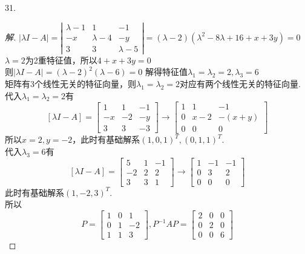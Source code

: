\documentclass[10pt,a4paper]{report}
\begin{document}
31.
\begin{proof}[解]
	$|\lambda I - A| = \left|
	\begin{matrix}
	\lambda-1 & 1 & -1\\
	-x & \lambda-4 & -y\\
	3 & 3 & \lambda - 5
	\end{matrix}
	\right| = (\lambda - 2)(\lambda^{2}-8\lambda+16+x+3y) = 0$\\
	$\lambda = 2$为2重特征值，所以$4+x+3y = 0$\\
	则$|\lambda I - A| = (\lambda - 2)^{2}(\lambda-6) = 0$
	解得特征值$\lambda_1 = \lambda_2 = 2, \lambda_3 = 6$\\
	矩阵有3个线性无关的特征向量，则$\lambda_1 = \lambda_2 = 2$对应有两个线性无关的特征向量.\\
	代入$\lambda_1 = \lambda_2 = 2$有
	$$[\lambda I - A] = \left[
	\begin{matrix}
	1 & 1 & -1\\
	-x & -2 & -y\\
	3 & 3 & -3
	\end{matrix}
	\right] \rightarrow \left[
	\begin{matrix}
	1 & 1 & -1\\
	0 & x-2 & -(x+y)\\
	0 & 0 & 0
	\end{matrix}
	\right] $$
	所以$x = 2, y = -2$，此时有基础解系$(1,0,1)^{T},(0,1,1)^{T}$.\\
	代入$\lambda_3 = 6$有
	$$[\lambda I - A] = \left[
	\begin{matrix}
	5 & 1 & -1\\
	-2 & 2 & 2\\
	3 & 3 & 1
	\end{matrix}
	\right] \rightarrow \left[
	\begin{matrix}
	1 & -1 & -1\\
	0 & 3 & 2\\
	0 & 0 & 0
	\end{matrix}
	\right] $$
	此时有基础解系$(1,-2,3)^{T}$.\\
	所以
	$$P = 
	\left[
	\begin{matrix}
	1 & 0 & 1\\
	0 & 1 & -2\\
	1 & 1 & 3
	\end{matrix}
	\right], P^{-1}AP = \left[
	\begin{matrix}
	2 & 0 & 0\\
	0 & 2 & 0\\
	0 & 0 & 6
	\end{matrix}
	\right]
	$$
\end{proof}
\end{document}
